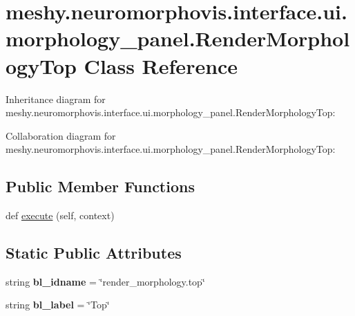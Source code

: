 \hypertarget{classmeshy_1_1neuromorphovis_1_1interface_1_1ui_1_1morphology__panel_1_1RenderMorphologyTop}{}\section{meshy.\+neuromorphovis.\+interface.\+ui.\+morphology\+\_\+panel.\+Render\+Morphology\+Top Class Reference}
\label{classmeshy_1_1neuromorphovis_1_1interface_1_1ui_1_1morphology__panel_1_1RenderMorphologyTop}


Inheritance diagram for meshy.\+neuromorphovis.\+interface.\+ui.\+morphology\+\_\+panel.\+Render\+Morphology\+Top\+:


Collaboration diagram for meshy.\+neuromorphovis.\+interface.\+ui.\+morphology\+\_\+panel.\+Render\+Morphology\+Top\+:
\subsection*{Public Member Functions}
\begin{DoxyCompactItemize}
\item 
def \hyperlink{classmeshy_1_1neuromorphovis_1_1interface_1_1ui_1_1morphology__panel_1_1RenderMorphologyTop_a42d67cb82d9b4e51861e0f24d3b08a9c}{execute} (self, context)
\end{DoxyCompactItemize}
\subsection*{Static Public Attributes}
\begin{DoxyCompactItemize}
\item 
string {\bfseries bl\+\_\+idname} = \char`\"{}render\+\_\+morphology.\+top\char`\"{}\hypertarget{classmeshy_1_1neuromorphovis_1_1interface_1_1ui_1_1morphology__panel_1_1RenderMorphologyTop_aca627b95dcd666f35e62dc963f42eb88}{}\label{classmeshy_1_1neuromorphovis_1_1interface_1_1ui_1_1morphology__panel_1_1RenderMorphologyTop_aca627b95dcd666f35e62dc963f42eb88}

\item 
string {\bfseries bl\+\_\+label} = \char`\"{}Top\char`\"{}\hypertarget{classmeshy_1_1neuromorphovis_1_1interface_1_1ui_1_1morphology__panel_1_1RenderMorphologyTop_a5a1883be6fa2e62e1510cba4b6407b91}{}\label{classmeshy_1_1neuromorphovis_1_1interface_1_1ui_1_1morphology__panel_1_1RenderMorphologyTop_a5a1883be6fa2e62e1510cba4b6407b91}

\end{DoxyCompactItemize}


